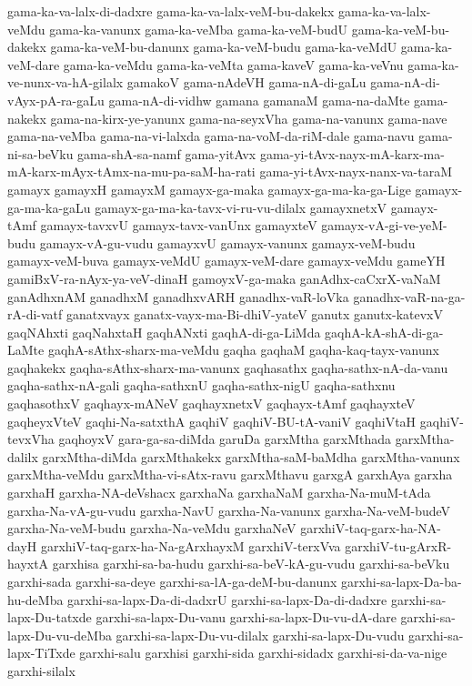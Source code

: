 {gama-ka-va-lalx-di-dadxre
gama-ka-va-lalx-veM-bu-dakekx
gama-ka-va-lalx-veMdu
gama-ka-vanunx
gama-ka-veMba
gama-ka-veM-budU
gama-ka-veM-bu-dakekx
gama-ka-veM-bu-danunx
gama-ka-veM-budu
gama-ka-veMdU
gama-ka-veM-dare
gama-ka-veMdu
gama-ka-veMta
gama-kaveV
gama-ka-veVnu
gama-ka-ve-nunx-va-hA-gilalx
gamakoV
gama-nAdeVH
gama-nA-di-gaLu
gama-nA-di-vAyx-pA-ra-gaLu
gama-nA-di-vidhw
gamana
gamanaM
gama-na-daMte
gama-nakekx
gama-na-kirx-ye-yanunx
gama-na-seyxVha
gama-na-vanunx
gama-nave
gama-na-veMba
gama-na-vi-lalxda
gama-na-voM-da-riM-dale
gama-navu
gama-ni-sa-beVku
gama-shA-sa-namf
gama-yitAvx
gama-yi-tAvx-nayx-mA-karx-ma-mA-karx-mAyx-tAmx-na-mu-pa-saM-ha-rati
gama-yi-tAvx-nayx-nanx-va-taraM
gamayx
gamayxH
gamayxM
gamayx-ga-maka
gamayx-ga-ma-ka-ga-Lige
gamayx-ga-ma-ka-gaLu
gamayx-ga-ma-ka-tavx-vi-ru-vu-dilalx
gamayxnetxV
gamayx-tAmf
gamayx-tavxvU
gamayx-tavx-vanUnx
gamayxteV
gamayx-vA-gi-ve-yeM-budu
gamayx-vA-gu-vudu
gamayxvU
gamayx-vanunx
gamayx-veM-budu
gamayx-veM-buva
gamayx-veMdU
gamayx-veM-dare
gamayx-veMdu
gameYH
gamiBxV-ra-nAyx-ya-veV-dinaH
gamoyxV-ga-maka
ganAdhx-caCxrX-vaNaM
ganAdhxnAM
ganadhxM
ganadhxvARH
ganadhx-vaR-loVka
ganadhx-vaR-na-ga-rA-di-vatf
ganatxvayx
ganatx-vayx-ma-Bi-dhiV-yateV
ganutx
ganutx-katevxV
gaqNAhxti
gaqNahxtaH
gaqhANxti
gaqhA-di-ga-LiMda
gaqhA-kA-shA-di-ga-LaMte
gaqhA-sAthx-sharx-ma-veMdu
gaqha
gaqhaM
gaqha-kaq-tayx-vanunx
gaqhakekx
gaqha-sAthx-sharx-ma-vanunx
gaqhasathx
gaqha-sathx-nA-da-vanu
gaqha-sathx-nA-gali
gaqha-sathxnU
gaqha-sathx-nigU
gaqha-sathxnu
gaqhasothxV
gaqhayx-mANeV
gaqhayxnetxV
gaqhayx-tAmf
gaqhayxteV
gaqheyxVteV
gaqhi-Na-satxthA
gaqhiV
gaqhiV-BU-tA-vaniV
gaqhiVtaH
gaqhiV-tevxVha
gaqhoyxV
gara-ga-sa-diMda
garuDa
garxMtha
garxMthada
garxMtha-dalilx
garxMtha-diMda
garxMthakekx
garxMtha-saM-baMdha
garxMtha-vanunx
garxMtha-veMdu
garxMtha-vi-sAtx-ravu
garxMthavu
garxgA
garxhAya
garxha
garxhaH
garxha-NA-deVshacx
garxhaNa
garxhaNaM
garxha-Na-muM-tAda
garxha-Na-vA-gu-vudu
garxha-NavU
garxha-Na-vanunx
garxha-Na-veM-budeV
garxha-Na-veM-budu
garxha-Na-veMdu
garxhaNeV
garxhiV-taq-garx-ha-NA-dayH
garxhiV-taq-garx-ha-Na-gArxhayxM
garxhiV-terxVva
garxhiV-tu-gArxR-hayxtA
garxhisa
garxhi-sa-ba-hudu
garxhi-sa-beV-kA-gu-vudu
garxhi-sa-beVku
garxhi-sada
garxhi-sa-deye
garxhi-sa-lA-ga-deM-bu-danunx
garxhi-sa-lapx-Da-ba-hu-deMba
garxhi-sa-lapx-Da-di-dadxrU
garxhi-sa-lapx-Da-di-dadxre
garxhi-sa-lapx-Du-tatxde
garxhi-sa-lapx-Du-vanu
garxhi-sa-lapx-Du-vu-dA-dare
garxhi-sa-lapx-Du-vu-deMba
garxhi-sa-lapx-Du-vu-dilalx
garxhi-sa-lapx-Du-vudu
garxhi-sa-lapx-TiTxde
garxhi-salu
garxhisi
garxhi-sida
garxhi-sidadx
garxhi-si-da-va-nige
garxhi-silalx
}
